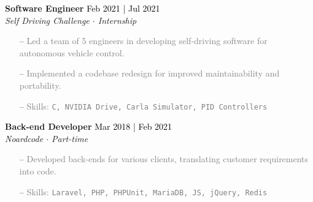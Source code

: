 \documentclass[a4paper]{article}
\begin{document}
\textbf{Software Engineer} \hfill \textcolor{black}{Feb 2021 | Jul 2021}\\
\textit{Self Driving Challenge $\cdot$ Internship}\\
\vspace{-1mm}
\begin{itemize} \itemsep 1pt
    \item[--] \textcolor{gray}{Led a team of 5 engineers in developing self-driving software for autonomous vehicle control.}
    \item[--] \textcolor{gray}{Implemented a codebase redesign for improved maintainability and portability.}
	\item[--] \textcolor{gray}{Skills: \texttt{C\scalebox{0.7}{++}, NVIDIA Drive, Carla Simulator, PID Controllers}}
\end{itemize}


\textbf{Back-end Developer} \hfill \textcolor{black}{Mar 2018 | Feb 2021}\\
\textit{Noardcode $\cdot$ Part-time}\\
\vspace{-1mm}
\begin{itemize} \itemsep 1pt
    \item[--] \textcolor{gray}{Developed back-ends for various clients, translating customer requirements into code.}

	\item[--] \textcolor{gray}{Skills: \texttt{Laravel, PHP, PHPUnit, MariaDB, JS, jQuery, Redis}}
\end{itemize}
\end{document}
